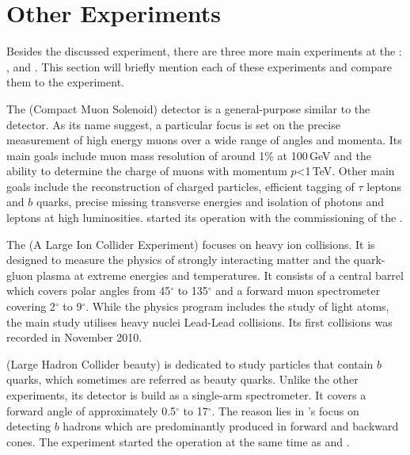 \documentclass[bachelor,ngerman,english]{GAUBM}
\begin{document}
\section{Other Experiments}
\label{sec:exp:other_experiments}
Besides the discussed \atlas experiment, there are three more main experiments at the \lhc: \cms, \alice and \lhcb. This section will briefly mention each of these experiments and compare them to the \atlas experiment.

The \cms (Compact Muon Solenoid) \cite{other:cms} detector is a general-purpose similar to the \atlas detector. As its name suggest, a particular focus is set on the precise measurement of high energy muons over a wide range of angles and momenta. Its main goals include muon mass resolution of around 1\% at 100\,GeV and the ability to determine the charge of muons with momentum $p$<1\,TeV. Other main goals include the reconstruction of charged particles, efficient tagging of $\tau$ leptons and $b$ quarks, precise missing transverse energies and isolation of photons and leptons at high luminosities. \cms started its operation with the commissioning of the \lhc.


The \alice (A Large Ion Collider Experiment) \cite{other:alice} focuses on heavy ion collisions. It is designed to measure the physics of strongly interacting matter and the quark-gluon plasma at extreme energies and temperatures. It consists of a central barrel which covers polar angles from 45$^\circ$ to 135$^\circ$ and a forward muon spectrometer covering 2$^\circ$ to 9$^\circ$. While the \alice physics program includes the study of light atoms, the main study utilises heavy nuclei Lead-Lead collisions. Its first collisions was recorded in November 2010.


\lhcb (Large Hadron Collider beauty) \cite{other:lhcb} is dedicated to study particles that contain $b$ quarks, which sometimes are referred as beauty quarks. Unlike the other experiments, its detector is build as a single-arm spectrometer. It covers a forward angle of approximately 0.5$^\circ$ to 17$^\circ$. The reason lies in \lhcb's focus on detecting $b$ hadrons which are predominantly produced in forward and backward cones. The \lhcb experiment started the operation at the same time as \atlas and \cms.
\end{document}
